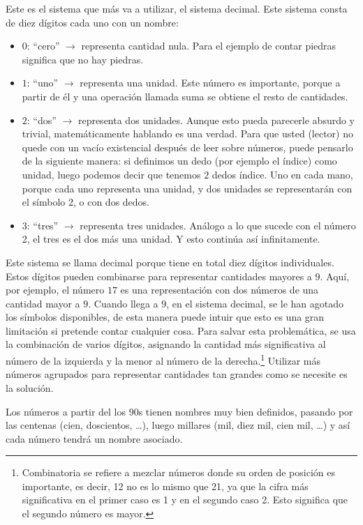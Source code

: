 Este es el sistema que más va a utilizar, el sistema decimal. Este sistema consta de diez dígitos cada uno con un nombre:
\begin{itemize}
  \item \(0\): ``cero'' \(\rightarrow\) representa cantidad nula. Para el ejemplo de contar piedras significa que no hay piedras.
  \item \(1\): ``uno'' \(\rightarrow\) representa una unidad. Este número es importante, porque a partir de él y una operación llamada suma se obtiene el resto de cantidades.
  \item \(2\): ``dos'' \(\rightarrow\) representa dos unidades. Aunque esto pueda parecerle absurdo y trivial, matemáticamente hablando es una verdad. Para que usted (lector) no quede con un vacío existencial después de leer sobre números, puede pensarlo de la siguiente manera: si definimos un dedo (por ejemplo el índice) como unidad, luego podemos decir que tenemos \(2\) dedos índice. Uno en cada mano, porque cada uno representa una unidad, y dos unidades se representarán con el símbolo 2, o con dos dedos.
  \item \(3\): ``tres'' \(\rightarrow\) representa tres unidades. Análogo a lo que sucede con el número 2, el tres es el dos más una unidad. Y esto continúa así infinitamente.
\end{itemize}
Este sistema se llama decimal porque tiene en total diez dígitos individuales. Estos dígitos pueden combinarse para representar cantidades mayores a \(9\). Aquí, por ejemplo, el número \(17\) es una representación con dos números de una cantidad mayor a \(9\). Cuando llega a \(9\), en el sistema decimal, se le han agotado los símbolos disponibles, de esta manera puede intuir que esto es una gran limitación si pretende contar cualquier cosa. Para salvar esta problemática, se usa la combinación de varios dígitos, asignando la cantidad más significativa al número de la izquierda y la menor al número de la derecha.\footnote{Combinatoria se refiere a mezclar números donde su orden de posición es importante, es decir, 12 no es lo mismo que 21, ya que la cifra más significativa en el primer caso es 1 y en el segundo caso 2. Esto significa que el segundo número es mayor.} Utilizar más números agrupados para representar cantidades tan grandes como se necesite es la solución.

Los números a partir del los 90s tienen nombres muy bien definidos, pasando por las centenas (cien, doscientos, \dots), luego millares (mil, diez mil, cien mil, \dots) y así cada número tendrá un nombre asociado. 

